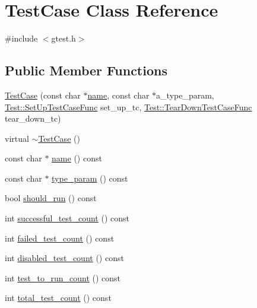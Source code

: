 \hypertarget{classtesting_1_1TestCase}{\section{\-Test\-Case \-Class \-Reference}
\label{d0/d9a/classtesting_1_1TestCase}
}


{\ttfamily \#include $<$gtest.\-h$>$}

\subsection*{\-Public \-Member \-Functions}
\begin{DoxyCompactItemize}
\item 
\hyperlink{classtesting_1_1TestCase_adf0dcf842d3506fd22c91de33f79df86}{\-Test\-Case} (const char $\ast$\hyperlink{classtesting_1_1TestCase_a862958aa3c2b9bf36903f1f0f2e81c54}{name}, const char $\ast$a\-\_\-type\-\_\-param, \hyperlink{classtesting_1_1Test_a2df065892efeff7ca91bb2d2fbe00975}{\-Test\-::\-Set\-Up\-Test\-Case\-Func} set\-\_\-up\-\_\-tc, \hyperlink{classtesting_1_1Test_a4ae7a4e140c70dee5c9cb82e13ae570c}{\-Test\-::\-Tear\-Down\-Test\-Case\-Func} tear\-\_\-down\-\_\-tc)
\item 
virtual \hyperlink{classtesting_1_1TestCase_ab5565cf238c1b95c8113950cf9eb80b5}{$\sim$\-Test\-Case} ()
\item 
const char $\ast$ \hyperlink{classtesting_1_1TestCase_a862958aa3c2b9bf36903f1f0f2e81c54}{name} () const 
\item 
const char $\ast$ \hyperlink{classtesting_1_1TestCase_ad596248661b2f4017c041425fa4c8b10}{type\-\_\-param} () const 
\item 
bool \hyperlink{classtesting_1_1TestCase_ad82d0b35f1d10f27e8d03440f16ca467}{should\-\_\-run} () const 
\item 
int \hyperlink{classtesting_1_1TestCase_ab955f67bc1fe8ef62a7e72906ccece2a}{successful\-\_\-test\-\_\-count} () const 
\item 
int \hyperlink{classtesting_1_1TestCase_afd8bbd35c7ee99960abb321cfdff3119}{failed\-\_\-test\-\_\-count} () const 
\item 
int \hyperlink{classtesting_1_1TestCase_a10ec677118627074973fc20c9271b204}{disabled\-\_\-test\-\_\-count} () const 
\item 
int \hyperlink{classtesting_1_1TestCase_aa6eccf86072f4f8ddd0bea30dfd45912}{test\-\_\-to\-\_\-run\-\_\-count} () const 
\item 
int \hyperlink{classtesting_1_1TestCase_a0eb7286957aeb126d9926c33407a15a3}{total\-\_\-test\-\_\-count} () const 

\end{DoxyCompactItemize}
